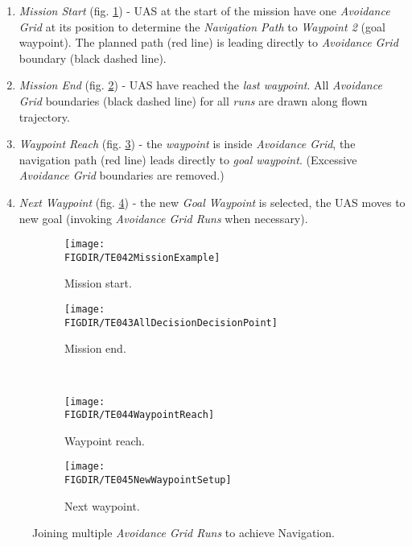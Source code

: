 \begin{enumerate}
    \item \emph{Mission Start} (fig. \ref{fig:missionExampleWithOAGR}) - UAS at the start of the mission have one \emph{Avoidance Grid} at its position to determine the \emph{Navigation Path} to \emph{Waypoint 2} (goal waypoint). The planned path (red line) is leading directly to \emph{Avoidance Grid} boundary (black dashed line).
    
    \item \emph{Mission End} (fig. \ref{fig:finishedMissionAGR}) - UAS have reached 
    the \emph{last waypoint}. All \emph{Avoidance Grid} boundaries (black dashed line) for all \emph{runs} are drawn along flown trajectory. 
    
    \item \emph{Waypoint Reach} (fig. \ref{fig:waypointReachAGR}) - the \emph{waypoint} is inside \emph{Avoidance Grid}, the navigation path (red line) leads directly to \emph{goal waypoint}. (Excessive \emph{Avoidance Grid} boundaries are removed.)
    
    \item \emph{Next Waypoint} (fig. \ref{fig:newtWaypointAGR}) - the new \emph{Goal Waypoint} is selected, the UAS moves to new goal (invoking \emph{Avoidance Grid Runs} when necessary).
    
\end{enumerate}

\begin{figure}[H]
    \centering
    \begin{subfigure}{0.48\textwidth}
        \centering
        \texttt{[image: \\FIGDIR/TE042MissionExample]}
        \caption{Mission start.}
        \label{fig:missionExampleWithOAGR}
    \end{subfigure}
    \begin{subfigure}{0.48\textwidth}
    	\centering
        \texttt{[image: \\FIGDIR/TE043AllDecisionDecisionPoint]} 
        \caption{Mission end.}
        \label{fig:finishedMissionAGR}
    \end{subfigure}
    \\
    \centering
    \begin{subfigure}{0.48\textwidth}
        \centering
        \texttt{[image: \\FIGDIR/TE044WaypointReach]}
        \caption{Waypoint reach.}
        \label{fig:waypointReachAGR}
    \end{subfigure}
    \begin{subfigure}{0.48\textwidth}
    	\centering
        \texttt{[image: \\FIGDIR/TE045NewWaypointSetup]} 
        \caption{Next waypoint.}
        \label{fig:newtWaypointAGR}
    \end{subfigure}
    \caption{Joining multiple \emph{Avoidance Grid Runs} to achieve Navigation.}
    \label{fig:joiningMultipleAGRS}
    
\end{figure}
    


